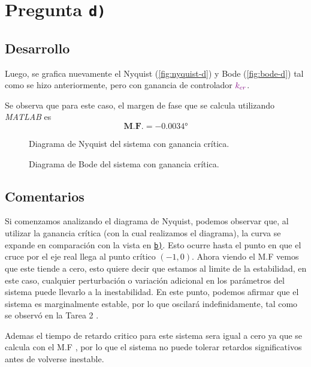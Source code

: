 \section{Pregunta \texttt{d)}}\label{pregunta-d}

\subsection{Desarrollo}

Luego, se grafica nuevamente el Nyquist (\autoref{fig:nyquist-d}) y Bode (\autoref{fig:bode-d})
tal como se hizo anteriormente, pero con ganancia de controlador $\mathbin{\color{violet}k_{cr}}$.

Se observa que para este caso, el margen de fase que se calcula utilizando
\textit{MATLAB} es
\begin{equation}
  \boxed{\textbf{M.F.} = \ang{-0.0034}}
\end{equation}

\begin{figure}[h]
  \centering
  
  \caption{Diagrama de Nyquist del sistema con ganancia crítica.}
  \label{fig:nyquist-d}
\end{figure}

\begin{figure}[h]
  \centering
  
  \caption{Diagrama de Bode del sistema con ganancia crítica.}
  \label{fig:bode-d}
\end{figure}


\FloatBarrier
\subsection{Comentarios}



Si comenzamos analizando el diagrama de Nyquist, podemos observar que, al utilizar la ganancia crítica (con la cual realizamos el diagrama), la curva se expande en comparación con la vista en \hyperref[pregunta-b]{\texttt{b)}}. Esto ocurre hasta el punto en que el cruce por el eje real llega al punto crítico 
\((-1, 0)\).
Ahora viendo el M.F vemos que este tiende a cero, esto quiere decir que estamos al limite de la estabilidad, en este caso, cualquier perturbación o variación adicional en los parámetros del sistema puede llevarlo a la inestabilidad. En este punto, podemos afirmar que el sistema es marginalmente estable, por lo que oscilará indefinidamente, tal como se observó en la Tarea 2 \cite{tarea-2-sdc}.

Ademas el tiempo de retardo critico para este sistema sera igual a cero ya que se calcula con el M.F , por lo que el sistema no puede tolerar retardos significativos antes de volverse inestable.

